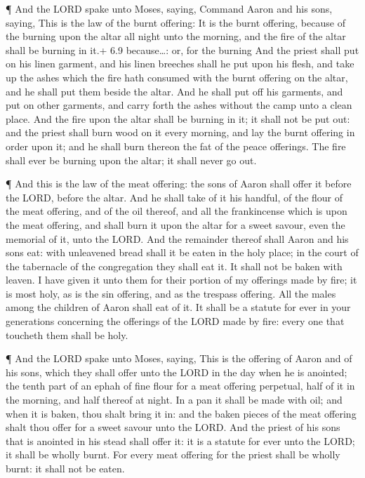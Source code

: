  ¶ And the LORD spake unto Moses, saying, 
Command Aaron and his sons, saying, This is the law of the burnt
offering: It is the burnt offering, because of the burning upon the
altar all night unto the morning, and the fire of the altar shall be
burning in it.+ 6.9 because\ldots: or, for the burning  And
the priest shall put on his linen garment, and his linen breeches shall
he put upon his flesh, and take up the ashes which the fire hath
consumed with the burnt offering on the altar, and he shall put them
beside the altar.  And he shall put off his garments, and
put on other garments, and carry forth the ashes without the camp unto a
clean place.  And the fire upon the altar shall be burning
in it; it shall not be put out: and the priest shall burn wood on it
every morning, and lay the burnt offering in order upon it; and he shall
burn thereon the fat of the peace offerings.  The fire
shall ever be burning upon the altar; it shall never go out.

 ¶ And this is the law of the meat offering: the sons of
Aaron shall offer it before the LORD, before the altar. 
And he shall take of it his handful, of the flour of the meat offering,
and of the oil thereof, and all the frankincense which is upon the meat
offering, and shall burn it upon the altar for a sweet savour, even the
memorial of it, unto the LORD.  And the remainder thereof
shall Aaron and his sons eat: with unleavened bread shall it be eaten in
the holy place; in the court of the tabernacle of the congregation they
shall eat it.  It shall not be baken with leaven. I have
given it unto them for their portion of my offerings made by fire; it is
most holy, as is the sin offering, and as the trespass offering.
 All the males among the children of Aaron shall eat of it.
It shall be a statute for ever in your generations concerning the
offerings of the LORD made by fire: every one that toucheth them shall
be holy.

 ¶ And the LORD spake unto Moses, saying, 
This is the offering of Aaron and of his sons, which they shall offer
unto the LORD in the day when he is anointed; the tenth part of an ephah
of fine flour for a meat offering perpetual, half of it in the morning,
and half thereof at night.  In a pan it shall be made with
oil; and when it is baken, thou shalt bring it in: and the baken pieces
of the meat offering shalt thou offer for a sweet savour unto the LORD.
 And the priest of his sons that is anointed in his stead
shall offer it: it is a statute for ever unto the LORD; it shall be
wholly burnt.  For every meat offering for the priest shall
be wholly burnt: it shall not be eaten.

